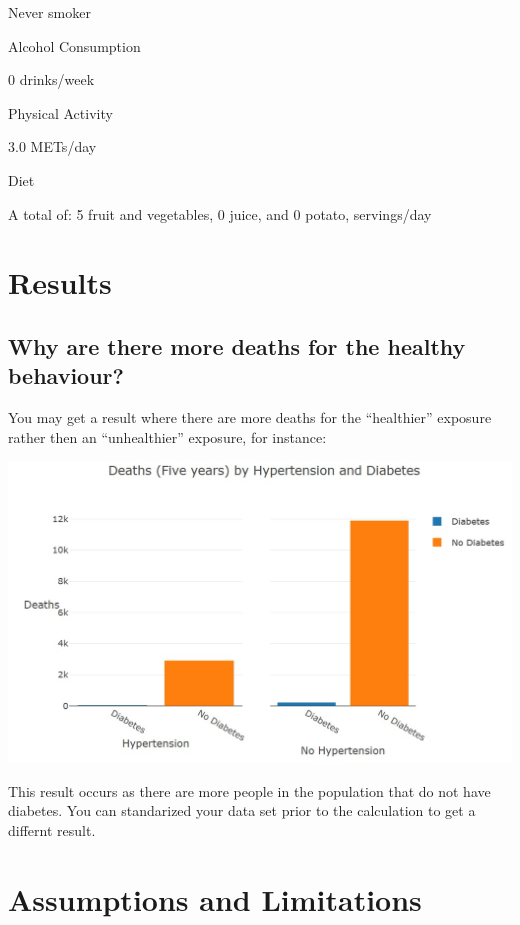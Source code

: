 \documentclass[]{book}
\begin{document}
Never smoker

Alcohol Consumption

0 drinks/week

Physical Activity

3.0 METs/day

Diet

A total of: 5 fruit and vegetables, 0 juice, and 0 potato, servings/day

\section{Results}\label{results}

\subsection{Why are there more deaths for the healthy
behaviour?}\label{why-are-there-more-deaths-for-the-healthy-behaviour}

You may get a result where there are more deaths for the ``healthier''
exposure rather then an ``unhealthier'' exposure, for instance:

\begin{center}\includegraphics{Images/Graph-hypertension-diabetes} \end{center}

This result occurs as there are more people in the population that do
not have diabetes. You can standarized your data set prior to the
calculation to get a differnt result.

\section{Assumptions and Limitations}\label{assumptions-and-limitations}
\end{document}
